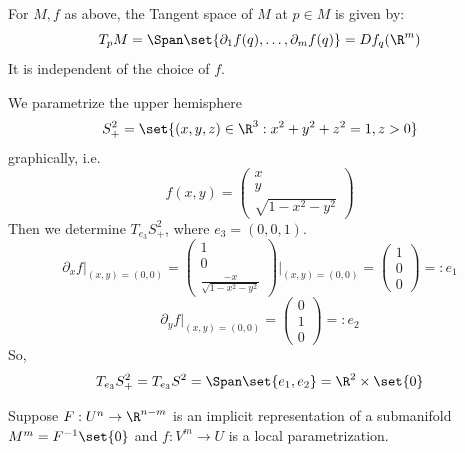 \begin{definition*}
For $M, f$ as above, the Tangent space of $M$ at $p \in M$ is given by:
\[ T_p M = \Span\set{\partial_1 f(q), \dots, \partial_m f(q)} = Df_q(\R^m) \]
It is independent of the choice of $f$.
\end{definition*}

\begin{example*}
We parametrize the upper hemisphere
\[ S_+^2 = \set{(x,y,z) \in \R^3 : x^2 + y^2 + z^2 = 1, z > 0} \]
graphically, i.e.
\[ f(x,y) = \begin{pmatrix} x \\ y \\ \sqrt{1 - x^2 - y^2} \end{pmatrix} \]
Then we determine $T_{e_3} S_+^2$, where $e_3 = (0,0,1)$.
\[ \partial_x f \Big|_{(x,y)=(0,0)} = \begin{pmatrix} 1 \\ 0 \\ \frac{-x}{\sqrt{1 - x^2 - y^2}} \end{pmatrix} \Bigg|_{(x,y)=(0,0)} = \begin{pmatrix} 1 \\ 0 \\ 0 \end{pmatrix} =: e_1 \]
\[ \partial_y f \Big|_{(x,y)=(0,0)} = \begin{pmatrix} 0 \\ 1 \\ 0 \end{pmatrix} =: e_2 \]
So,
\[ T_{e_3} S_+^2 = T_{e_3} S^2 = \Span\set{e_1, e_2} = \R^2 \times \set{0} \]

\begin{center}
\end{center}
\end{example*}

Suppose $F: U^n \to \R^{n-m}$ is an implicit representation of a submanifold $M^m = F^{-1}\set{0}$ and $f: V^m \to U$ is a local parametrization.

